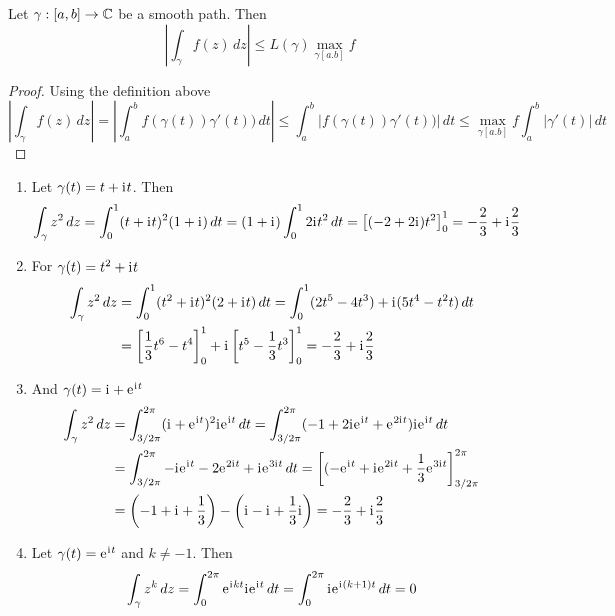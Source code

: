 \begin{lemma}
Let \( \gamma: [a,b] \to \mathbb{C} \) be a smooth path. Then
	\[
		\left| \int_{\gamma} f(z)\,dz \right| \le L(\gamma) \max_{\gamma[a.b]} f 
	\]
\end{lemma}

\begin{proof} Using the definition above
	\[
		\left| \int_{\gamma} f(z)\,dz \right|
			  = \left| \int_a^b f(\gamma(t))\gamma'(t))\,dt \right|
			  \le \int_a^b |f(\gamma(t))\gamma'(t))|\,dt 
			  \le  \max_{\gamma[a.b]}f \int_a^b |\gamma'(t)|\,dt 
	\]
\end{proof}
\bigskip


\begin{examples}\hfill
    \begin{enumerate}
        \item Let \( \gamma(t) = t + \mathrm{i}\mkern1mu t \). Then
			\[
				\int_{\gamma} z^2\,dz
					= \int_0^1 (t + \mathrm{i}\mkern1mu t)^2(1 + \mathrm{i}\mkern1mu)\,dt
					= (1 + \mathrm{i}\mkern1mu)\int_0^1 2\mathrm{i}\mkern1mu t^2\,dt 
					= \left[ (-2 + 2\mathrm{i}\mkern1mu) t^2 \right]_0^1 
					= -\frac{2}{3} + \mathrm{i}\mkern1mu \frac{2}{3}
			\]
		\item For \( \gamma(t) = t^2 + \mathrm{i}\mkern1mu t \) 
			\[
				\begin{split}
					\int_\gamma z^2\,dz
						& = \int_0^1 (t^2 + \mathrm{i}\mkern1mu t)^2(2 + \mathrm{i}\mkern1mu t)\,dt
							= \int_0^1 (2t^5 -  4t^3) + \mathrm{i}\mkern1mu(5t^4 - t^2t)\,dt \\
						& = \left[ \frac{1}{3} t^6 - t^4 \right]_0^1 + 
								\mathrm{i}\mkern1mu\left[ t^5 - \frac{1}{3}t^3 \right]_0^1
						  = -\frac{2}{3} + \mathrm{i}\mkern1mu \frac{2}{3}
				\end{split}
			\]
		\item And \( \gamma(t) = \mathrm{i}\mkern1mu + \mathrm{e}\mkern1mu^{\mathrm{i}\mkern1mu t} \)
			\[
				\begin{split}
					\int_\gamma z^2\,dz
						& = \int_{3/2\pi}^{2\pi} (\mathrm{i}\mkern1mu + \mathrm{e}\mkern1mu^{\mathrm{i}\mkern1mu t})^2\mathrm{i}\mkern1mu\mathrm{e}\mkern1mu^{\mathrm{i}\mkern1mu t}\,dt
							= \int_{3/2\pi}^{2\pi} (-1 + 2\mathrm{i}\mkern1mu\mathrm{e}\mkern1mu^{\mathrm{i}\mkern1mu t} + \mathrm{e}\mkern1mu^{2\mathrm{i}\mkern1mu t})\mathrm{i}\mkern1mu\mathrm{e}\mkern1mu^{\mathrm{i}\mkern1mu t}\,dt \\
						& = \int_{3/2\pi}^{2\pi} -\mathrm{i}\mkern1mu\mathrm{e}\mkern1mu^{\mathrm{i}\mkern1mu t} - 2\mathrm{e}\mkern1mu^{2\mathrm{i}\mkern1mu t} + \mathrm{i}\mkern1mu\mathrm{e}\mkern1mu^{3\mathrm{i}\mkern1mu t}\,dt
							= \left[(-\mathrm{e}\mkern1mu^{\mathrm{i}\mkern1mu t} + \mathrm{i}\mkern1mu\mathrm{e}\mkern1mu^{2\mathrm{i}\mkern1mu t} + \frac{1}{3}\mathrm{e}\mkern1mu^{3\mathrm{i}\mkern1mu t}\right]_{3/2\pi}^{2\pi} \\
						& = \left( -1 + \mathrm{i}\mkern1mu + \frac{1}{3} \right) - \left( \mathrm{i}\mkern1mu - \mathrm{i}\mkern1mu + \frac{1}{3}\mathrm{i}\mkern1mu \right)
							= -\frac{2}{3} + \mathrm{i}\mkern1mu \frac{2}{3}
				\end{split}
			\]
		\item Let \( \gamma(t) = \mathrm{e}\mkern1mu^{\mathrm{i}\mkern1mu t} \) and \( k \ne -1 \). Then
			\[
				\int_\gamma z^k\,dz = 
					\int_0^{2\pi} \mathrm{e}\mkern1mu^{\mathrm{i}\mkern1mu kt}\mathrm{i}\mkern1mu\mathrm{e}\mkern1mu^{\mathrm{i}\mkern1mu t}\,dt = 
					\int_0^{2\pi} \mathrm{i}\mkern1mu\mathrm{e}\mkern1mu^{\mathrm{i}\mkern1mu (k + 1) t}\,dt = 0
			\]
    \end{enumerate}
\end{examples}
\bigskip


